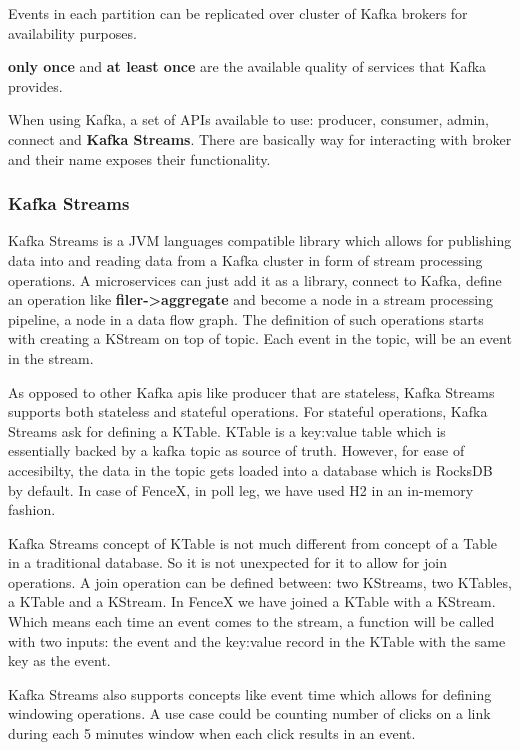 \documentclass[a4]{report}
\begin{document}
    Events in each partition can be replicated over cluster of Kafka brokers for availability purposes.

    \textbf{only once} and \textbf{at least once} are the available quality of services that Kafka provides.

    When using Kafka, a set of APIs available to use: producer, consumer, admin, connect and \textbf{Kafka Streams}.
    There are basically way for interacting with broker and their name exposes their functionality.

    \subsubsection{Kafka Streams \cite{kafkaStreamsJoins}}
    Kafka Streams is a JVM languages compatible library which allows for publishing data into and reading data from a
    Kafka cluster in form of stream processing operations.
    A microservices can just add it as a library, connect to Kafka, define an operation like \textbf{filer->aggregate}
    and become a node in a stream processing pipeline, a node in a data flow graph.
    The definition of such operations starts with creating a KStream on top of topic.
    Each event in the topic, will be an event in the stream.

    As opposed to other Kafka apis like producer that are stateless, Kafka Streams supports both stateless and
    stateful operations.
    For stateful operations, Kafka Streams ask for defining a KTable.
    KTable is a key:value table which is essentially backed by a kafka topic as source of truth.
    However, for ease of accesibilty, the data in the topic gets loaded into a database which is RocksDB by default.
    In case of FenceX, in poll leg, we have used H2 in an in-memory fashion.

    Kafka Streams concept of KTable is not much different from concept of a Table in a traditional database.
    So it is not unexpected for it to allow for join operations.
    A join operation can be defined between: two KStreams, two KTables, a KTable and a KStream.
    In FenceX we have joined a KTable with a KStream.
    Which means each time an event comes to the stream, a function will be called with two inputs: the event and the
    key:value record in the KTable with the same key as the event.

    Kafka Streams also supports concepts like event time which allows for defining windowing operations.
    A use case could be counting number of clicks on a link during each 5 minutes window when each click results in
    an event.
\end{document}
